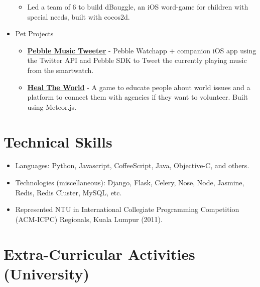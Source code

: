 \begin{itemize}
  \begin{itemize}
  \tightlist
  \item
    Led a team of 6 to build dBauggle, an iOS word-game for children
    with special needs, built with cocos2d.
  \end{itemize}
\item
  Pet Projects

  \begin{itemize}
  \tightlist
  \item
    \href{https://github.com/radzinzki/Pebble-MusicTweeter}{\textbf{Pebble
    Music Tweeter}} - Pebble Watchapp + companion iOS app using the
    Twitter API and Pebble SDK to Tweet the currently playing music from
    the smartwatch.
  \item
    \href{http://healtheworld.meteor.com/}{\textbf{Heal The World}} - A
    game to educate people about world issues and a platform to connect
    them with agencies if they want to volunteer. Built using Meteor.js.
  \end{itemize}
\end{itemize}

\section{Technical Skills}\label{technical-skills}

\begin{itemize}
\tightlist
\item
  Languages: Python, Javascript, CoffeeScript, Java, Objective-C, and
  others.
\item
  Technologies (miscellaneous): Django, Flask, Celery, Nose, Node,
  Jasmine, Redis, Redis Cluster, MySQL, etc.
\item
  Represented NTU in International Collegiate Programming Competition
  (ACM-ICPC) Regionals, Kuala Lumpur (2011).
\end{itemize}

\section{Extra-Curricular Activities
(University)}\label{extra-curricular-activities-university}

